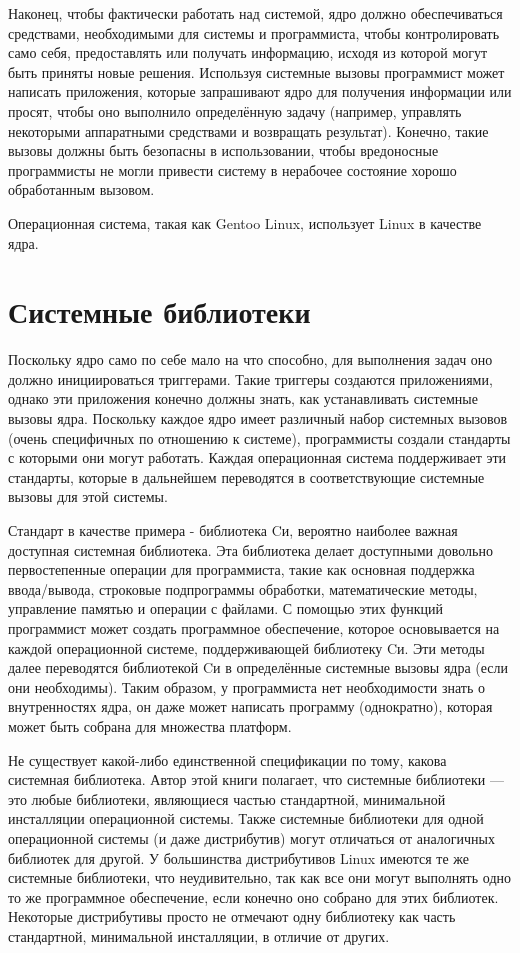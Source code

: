 \documentclass[10pt]{book}
\begin{document}
Наконец, чтобы фактически работать над системой, ядро должно обеспечиваться средствами, необходимыми для системы и программиста, чтобы контролировать само себя, предоставлять или получать информацию, исходя из которой могут быть приняты новые решения. Используя системные вызовы программист может написать приложения, которые запрашивают ядро для получения информации или просят, чтобы оно выполнило определённую задачу (например, управлять некоторыми аппаратными средствами и возвращать результат). Конечно, такие вызовы должны быть безопасны в использовании,  чтобы вредоносные программисты не могли привести систему в нерабочее состояние  хорошо обработанным вызовом.

Операционная система, такая как Gentoo Linux, использует Linux в качестве ядра.

\section{Системные библиотеки}

Поскольку ядро само по себе мало на что способно, для выполнения задач оно должно инициироваться триггерами. Такие триггеры создаются приложениями, однако эти приложения  конечно должны знать, как устанавливать системные вызовы ядра. Поскольку каждое ядро имеет различный набор системных вызовов (очень специфичных по отношению к системе), программисты создали стандарты с которыми они могут работать. Каждая операционная система поддерживает эти стандарты, которые в дальнейшем переводятся в соответствующие системные вызовы для этой системы.

Стандарт в качестве примера - библиотека Cи, вероятно наиболее важная доступная системная библиотека. Эта библиотека делает доступными довольно первостепенные операции для программиста, такие как основная поддержка ввода/вывода, строковые подпрограммы обработки, математические методы, управление памятью и операции с файлами. С помощью этих функций программист может создать программное обеспечение, которое основывается на каждой операционной системе, поддерживающей библиотеку Cи. Эти методы далее  переводятся библиотекой Cи в определённые системные вызовы ядра (если они необходимы). Таким образом, у программиста нет необходимости знать о внутренностях ядра, он даже может написать программу (однократно), которая может быть собрана для множества платформ.

Не существует какой-либо единственной спецификации по тому, какова системная библиотека. Автор этой книги полагает, что системные библиотеки — это любые библиотеки, являющиеся частью стандартной, минимальной инсталляции операционной системы. Также системные библиотеки для одной операционной системы (и даже дистрибутив) могут отличаться от аналогичных библиотек для другой. У большинства дистрибутивов Linux имеются те же системные библиотеки, что неудивительно, так как все они могут выполнять одно то же программное обеспечение, если конечно оно собрано для этих библиотек. Некоторые дистрибутивы просто не отмечают одну библиотеку как часть стандартной, минимальной инсталляции, в отличие от других.
\end{document}
